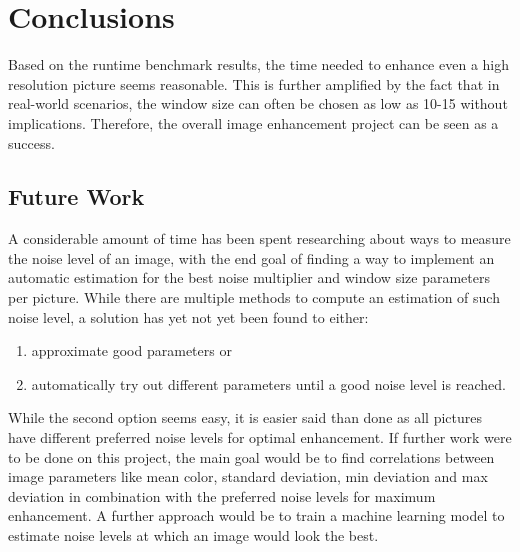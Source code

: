 \documentclass[sigconf]{acmart}
\begin{document}
\section{Conclusions}
Based on the runtime benchmark results, the time needed to enhance even a high resolution picture seems reasonable. This is further amplified by the fact that in real-world scenarios, the window size can often be chosen as low as 10-15 without implications. Therefore, the overall image enhancement project can be seen as a success.

\subsection{Future Work}
A considerable amount of time has been spent researching about ways to measure the noise level of an image, with the end goal of finding a way to implement an automatic estimation for the best noise multiplier and window size parameters per picture. While there are multiple methods to compute an estimation of such noise level, a solution has yet not yet been found to either:
\begin{enumerate}
    \item approximate good parameters or
    \item automatically try out different parameters until a good noise level is reached.
\end{enumerate}
While the second option seems easy, it is easier said than done as all pictures have different preferred noise levels for optimal enhancement. If further work were to be done on this project, the main goal would be to find correlations between image parameters like mean color, standard deviation, min deviation and max deviation in combination with the preferred noise levels for maximum enhancement. A further approach would be to train a machine learning model to estimate noise levels at which an image would look the best.



\end{document}
